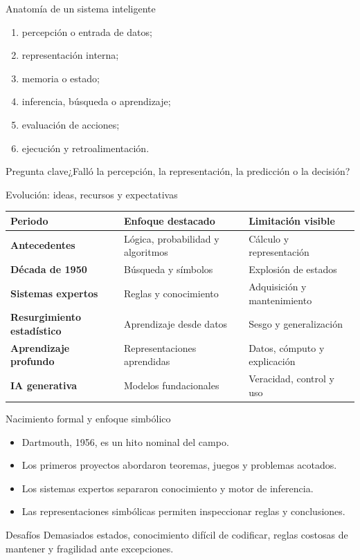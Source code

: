 \documentclass[aspectratio=169,11pt]{beamer}
\newcommand{\pregunta}[1]{\begin{block}{Pregunta clave}#1\end{block}}
\begin{document}
\begin{frame}{Anatomía de un sistema inteligente}
  \begin{enumerate}
    \item percepción o entrada de datos;
    \item representación interna;
    \item memoria o estado;
    \item inferencia, búsqueda o aprendizaje;
    \item evaluación de acciones;
    \item ejecución y retroalimentación.
  \end{enumerate}
  \vfill
  \pregunta{¿Falló la percepción, la representación, la predicción o la decisión?}
\end{frame}

\begin{frame}{Evolución: ideas, recursos y expectativas}
  \scriptsize
  \begin{tabularx}{\textwidth}{>{\bfseries}p{} X X}
    \toprule
    Periodo & Enfoque destacado & Limitación visible \\
    \midrule
    Antecedentes & Lógica, probabilidad y algoritmos & Cálculo y representación \\
    Década de 1950 & Búsqueda y símbolos & Explosión de estados \\
    Sistemas expertos & Reglas y conocimiento & Adquisición y mantenimiento \\
    Resurgimiento estadístico & Aprendizaje desde datos & Sesgo y generalización \\
    Aprendizaje profundo & Representaciones aprendidas & Datos, cómputo y explicación \\
    IA generativa & Modelos fundacionales & Veracidad, control y uso \\
    \bottomrule
  \end{tabularx}
\end{frame}

\begin{frame}{Nacimiento formal y enfoque simbólico}
  \begin{itemize}
    \item Dartmouth, 1956, es un hito nominal del campo.
    \item Los primeros proyectos abordaron teoremas, juegos y problemas acotados.
    \item Los sistemas expertos separaron conocimiento y motor de inferencia.
    \item Las representaciones simbólicas permiten inspeccionar reglas y conclusiones.
  \end{itemize}
  \begin{block}{Desafíos}
    Demasiados estados, conocimiento difícil de codificar, reglas costosas de mantener y fragilidad ante excepciones.
  \end{block}
\end{frame}
\end{document}
